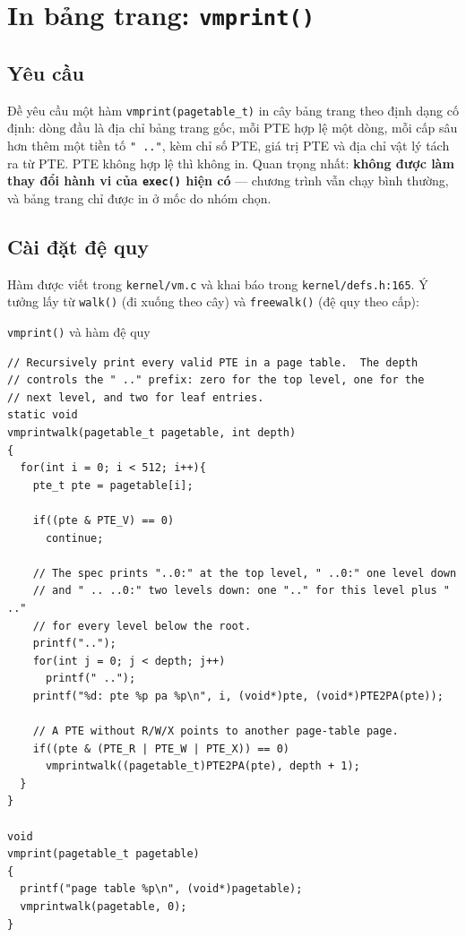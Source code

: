 \chapter{In bảng trang: \texttt{vmprint()}}

\newpage

\section{Yêu cầu}

Đề yêu cầu một hàm \texttt{vmprint(pagetable\_t)} in cây bảng trang theo định dạng cố định: dòng đầu là địa chỉ bảng trang gốc, mỗi PTE hợp lệ một dòng, mỗi cấp sâu hơn thêm một tiền tố \texttt{" .."}, kèm chỉ số PTE, giá trị PTE và địa chỉ vật lý tách ra từ PTE. PTE không hợp lệ thì không in. Quan trọng nhất: \textbf{không được làm thay đổi hành vi của \texttt{exec()} hiện có} --- chương trình vẫn chạy bình thường, và bảng trang chỉ được in ở mốc do nhóm chọn.

\section{Cài đặt đệ quy}

Hàm được viết trong \texttt{kernel/vm.c} và khai báo trong \texttt{kernel/defs.h:165}. Ý tưởng lấy từ \texttt{walk()} (đi xuống theo cây) và \texttt{freewalk()} (đệ quy theo cấp):

\begin{codebox}[vmprint]{\texttt{vmprint()} và hàm đệ quy}
    \begin{verbatim}
// Recursively print every valid PTE in a page table.  The depth
// controls the " .." prefix: zero for the top level, one for the
// next level, and two for leaf entries.
static void
vmprintwalk(pagetable_t pagetable, int depth)
{
  for(int i = 0; i < 512; i++){
    pte_t pte = pagetable[i];

    if((pte & PTE_V) == 0)
      continue;

    // The spec prints "..0:" at the top level, " ..0:" one level down
    // and " .. ..0:" two levels down: one ".." for this level plus " .."
    // for every level below the root.
    printf("..");
    for(int j = 0; j < depth; j++)
      printf(" ..");
    printf("%d: pte %p pa %p\n", i, (void*)pte, (void*)PTE2PA(pte));

    // A PTE without R/W/X points to another page-table page.
    if((pte & (PTE_R | PTE_W | PTE_X)) == 0)
      vmprintwalk((pagetable_t)PTE2PA(pte), depth + 1);
  }
}

void
vmprint(pagetable_t pagetable)
{
  printf("page table %p\n", (void*)pagetable);
  vmprintwalk(pagetable, 0);
}
    \end{verbatim}
\end{codebox}

